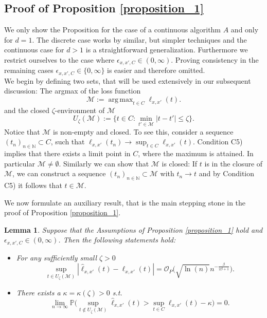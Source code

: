 \documentclass[conference]{IEEEtran}
\newtheorem{lemma}{Lemma}   \newtheorem{proposition}{Proposition}
\DeclareMathOperator*{\argmax}{arg\,max}
\begin{document}
\subsection{Proof of Proposition \ref{proposition_1}}

We only show the Proposition for the case of a continuous algorithm $A$ and only for $d=1$.  The discrete case works by similar, but simpler techniques and the continuous case for $d>1$ is a straightforward generalization. Furthermore we restrict ourselves to the case where $\epsilon_{x,x',C} \in (0, \infty)$. Proving consistency in the remaining cases $\epsilon_{x,x',C} \in \{0, \infty\}$ is easier and therefore omitted.\\
We begin by defining two sets, that will be used extensively in our subsequent discussion: The argmax of the loss function
$$
\mathcal{M}:= \argmax_{t \in C} \ell_{x,x'}(t).
$$
and the closed $\zeta$-environment of $\mathcal{M}$
$$
U_\zeta (\mathcal{M}) := \{t \in C: \min_{t' \in \mathcal{M}} |t-t'|\le \zeta   \}.
$$
Notice that $\mathcal{M}$ is non-empty and closed. To see this, consider a sequence $(t_n)_{n \in \mathbb{N}} \subset C$, such that $\ell_{x,x'}(t_n) \to \sup_{t \in C}\ell_{x,x'}(t)$. Condition C5) implies that there exists a limit point in $C$, where the maximum is attained. In particular $\mathcal{M} \neq \emptyset$. Similarly we can show that $\mathcal{M}$ is closed: If $t$ is in the closure of $\mathcal{M}$, we can construct a sequence $(t_n)_{n \in \mathbb{N}}\subset \mathcal{M}$ with $t_n \to t$ and by Condition C5) it follows that $t \in \mathcal{M}$. 

We now formulate an auxiliary result, that is the main stepping stone in the proof of Proposition \ref{proposition_1}.

\begin{lemma} \label{lemma_1}
Suppose that the Assumptions of Proposition \ref{proposition_1} hold and $\epsilon_{x,x',C} \in (0, \infty)$. Then the following statements hold:
\begin{itemize}
    \item[i)] For any sufficiently small $\zeta>0$
    $$\sup_{t \in U_\zeta (\mathcal{M})}|\hat \ell_{x,x'}(t)- \ell_{x,x'}(t)|=\mathcal{O}_P \Big( \sqrt{\ln(n)} n^{-\frac{\beta}{2\beta+1}}\Big). $$
    \item[ii)] There exists a $\kappa=\kappa(\zeta)>0$ s.t.
    \begin{equation*} 
    \lim_{n \to \infty} \mathbb{P}\Big( \sup_{t \not \in  U_\zeta(\mathcal{M})} \hat \ell_{x,x'}(t) > \sup_{t \in C}\ell_{x,x'}(t) -\kappa \Big) = 0.
\end{equation*}
\end{itemize}
\end{lemma}
\end{document}
